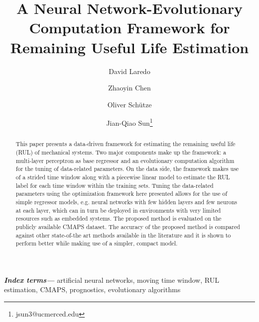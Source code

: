 \documentclass{article}
\title{A Neural Network-Evolutionary Computation Framework for Remaining Useful Life Estimation}
\author[1]{David Laredo}
\author[1]{Zhaoyin Chen}
\author[2]{Oliver Sch\"utze}
\author[1]{Jian-Qiao Sun\thanks{jsun3@ucmerced.edu}}
\affil[1]{School of Mechanical Engineering, University of California, Merced}
\affil[2]{Department of Computer Science, CINVESTAV, Mexico City, Mexico}
\date{}
\providecommand{\keywords}[1]{\textbf{\textit{Index terms---}} #1}
\begin{document}
\maketitle %

\thispagestyle{fancy} %


\glsunsetall


\begin{abstract}

\noindent 

This paper presents a data-driven framework for estimating the remaining useful life (RUL) of mechanical systems. Two major components make up the framework: a multi-layer perceptron as base regressor and an evolutionary computation algorithm for the tuning of data-related parameters. On the data side, the framework makes use of a strided time window along with a piecewise linear model to estimate the RUL label for each time window within the training sets. Tuning the data-related parameters using the optimization framework here presented allows for the use of simple regressor models, e.g. neural networks with few hidden layers and few neurons at each layer, which can in turn be deployed in environments with very limited resources such as embedded systems. The proposed method is evaluated on the publicly available CMAPS dataset. The accuracy of the proposed method is compared against other state-of-the art methods available in the literature and it is shown to perform better while making use of a simpler, compact model.
\end{abstract}

\keywords{artificial neural networks, moving time window, RUL estimation, CMAPS, prognostics, evolutionary algorithms}



\end{document}
